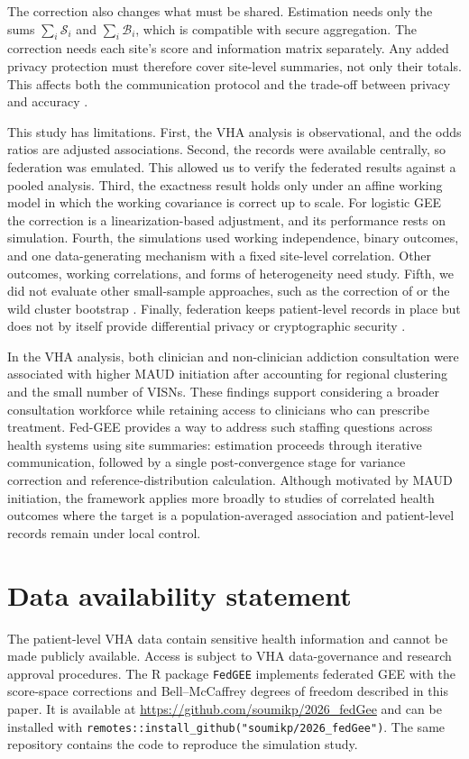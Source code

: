 \documentclass[12pt]{article}
\theoremstyle{remark}
\newcommand{\Scal}{\mathcal S}
\newcommand{\Bcal}{\mathcal B}
\begin{document}
The correction also changes what must be shared. Estimation needs only the sums
$\sum_i\Scal_i$ and $\sum_i\Bcal_i$, which is compatible with secure
aggregation. The correction needs each site's score and information matrix
separately. Any added privacy protection must therefore cover site-level
summaries, not only their totals. This affects both the communication protocol
and the trade-off between privacy and accuracy \citep{kairouz2021advances}.

This study has limitations. First, the VHA analysis is observational, and the
odds ratios are adjusted associations. Second, the records were available
centrally, so federation was emulated. This allowed us to verify the federated
results against a pooled analysis. Third, the exactness result holds only under
an affine working model in which the working covariance is correct up to scale.
For logistic GEE the correction is a linearization-based adjustment, and its
performance rests on simulation. Fourth, the simulations used working
independence, binary outcomes, and one data-generating mechanism with a fixed
site-level correlation. Other outcomes, working correlations, and forms of
heterogeneity need study. Fifth, we did not evaluate other small-sample
approaches, such as the correction of \citet{morel2003small} or the wild cluster
bootstrap \citep{cameron2008bootstrap}. Finally, federation keeps patient-level
records in place but does not by itself provide differential privacy or
cryptographic security \citep{rieke2020future,kairouz2021advances}.

In the VHA analysis, both clinician and non-clinician addiction consultation
were associated with higher MAUD initiation after accounting for regional
clustering and the small number of VISNs. These findings support considering
a broader consultation workforce while retaining access to clinicians who can
prescribe treatment. Fed-GEE provides a way to address such staffing questions
across health systems using site summaries: estimation proceeds through
iterative communication, followed by a single post-convergence stage for
variance correction and reference-distribution calculation. Although motivated
by MAUD initiation, the framework applies more broadly to studies of correlated
health outcomes where the target is a population-averaged association and
patient-level records remain under local control.

\section*{Data availability statement}
The patient-level VHA data contain sensitive health information and cannot be
made publicly available. Access is subject to VHA data-governance and research
approval procedures. The R package \texttt{FedGEE} implements federated GEE with
the score-space corrections and Bell--McCaffrey degrees of freedom described in
this paper. It is available at \url{https://github.com/soumikp/2026_fedGee} and can
be installed with \texttt{remotes::install\_github("soumikp/2026\_fedGee")}. The
same repository contains the code to reproduce the simulation study.
\end{document}
